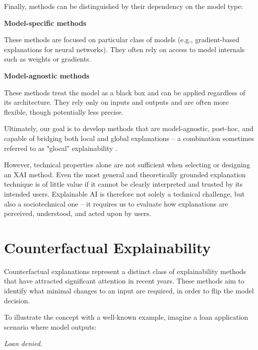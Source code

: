 \newpage

Finally, methods can be distinguished by their dependency on the model type:

\begin{multicols}{2}
    \centering \textbf{Model-specific methods} \\[4pt]
    \raggedright
    These methods are focused on particular class of models (e.g., gradient-based explanations for neural networks).
    They often rely on access to model internals such as weights or gradients.

    \columnbreak

    \centering \textbf{Model-agnostic methods} \\[4pt]
    \raggedright
    These methods treat the model as a black box and can be applied regardless of its architecture.
    They rely only on inputs and outputs and are often more flexible, though potentially less precise.
\end{multicols}

Ultimately, our goal is to develop methods that are model-agnostic, post-hoc, and capable of bridging both local and
global explanations -- a combination sometimes referred to as "glocal" explainability \cite{achtibat2023attribution}.

However, technical properties alone are not sufficient when selecting or designing an XAI method.
Even the most general and theoretically grounded explanation technique is of little value if it cannot be clearly interpreted and trusted by its intended users.
Explainable AI is therefore not solely a technical challenge, but also a sociotechnical one -- it requires us to evaluate how explanations are perceived,
understood, and acted upon by users.


\section{Counterfactual Explainability}

Counterfactual explanations represent a distinct class of explainability methods that have attracted significant attention in recent years.
These methods aim to identify what minimal changes to an input are required, in order to flip the model decision.

To illustrate the concept with a well-known example, imagine a loan application scenario where model outputs:

\begin{center}
    \textit{Loan denied.}
\end{center}

